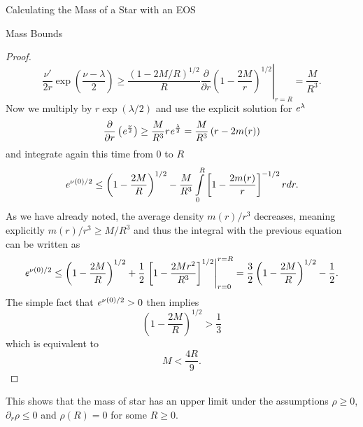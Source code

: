 \begin{section}{Calculating the Mass of a Star with an EOS}
\begin{subsection}{Mass Bounds}
\begin{proof}
	\begin{equation}
		\frac{\nu'}{2r}\exp\left(\frac{\nu-\lambda}{2}\right)\geq\frac{(1-2M/R)^{1/2}}{R}\left.\frac{\partial}{\partial r}\left(1-\frac{2M}{r}\right)^{1/2}\right|_{r=R} = \frac{M}{R^3}.
	\end{equation}
	Now we multiply by $r\exp(\lambda/2)$ and use the explicit solution for $\mathit{e}^\lambda$
	\begin{equation}
		\frac{\partial}{\partial r}\left(\mathit{e}^{\frac{\nu}{2}}\right) \geq \frac{M}{R^3}r\mathit{e}^\frac{\lambda}{2} = \frac{M}{R^3}\left(r-2m(r)\right)
	\end{equation}
	and integrate again this time from $0$ to $R$
	\begin{equation}
		\mathit{e}^{\nu(0)/2}\leq\left(1-\frac{2M}{R}\right)^{1/2}-\frac{M}{R^3}\int\limits_0^R\left[1-\frac{2m(r)}{r} \right]^{-1/2}rdr.
		\label{3-Mass-MassLimitNuApprox}
	\end{equation}
	As we have already noted, the average density $m(r)/r^3$ decreases, meaning explicitly $m(r)/r^3\geq M/R^3$ and thus the integral with the previous equation can be written as
	\begin{equation}
		\mathit{e}^{\nu(0)/2}\leq\left(1-\frac{2M}{R}\right)^{1/2}+\frac{1}{2}\left.\left[1-\frac{2Mr^2}{R^3} \right]^{1/2}\right|^{r=R}_{r=0} = \frac{3}{2}\left(1-\frac{2M}{R}\right)^{1/2} - \frac{1}{2}.
	\end{equation}
	The simple fact that $\mathit{e}^{\nu(0)/2}>0$ then implies
	\begin{equation}
		\left(1-\frac{2M}{R}\right)^{1/2} > \frac{1}{3}
	\end{equation}
	which is equivalent to
	\begin{equation}
		M< \frac{4R}{9}.
	\end{equation}
\end{proof}\noindent
This shows that the mass of star has an upper limit under the assumptions $\rho\geq0$, $\partial_r\rho\leq0$ and $\rho(R)=0$ for some $R\geq0$. 
\end{subsection}
%
%
\end{section}
 
